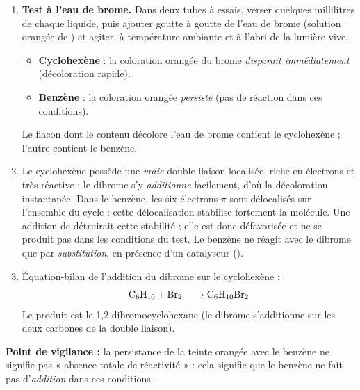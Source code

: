 \documentclass[11pt]{article}
\newcommand{\cle}[1]{{\popxbold\color{popdark}#1}}
\begin{document}
\begin{corrige}
\begin{enumerate}
\item \textbf{Test à l'eau de brome.} Dans deux tubes à essais, verser quelques millilitres de chaque liquide, puis ajouter goutte à goutte de l'eau de brome (solution orangée de ) et agiter, à température ambiante et à l'abri de la lumière vive.
\begin{itemize}
\item \textbf{Cyclohexène} : la coloration orangée du brome \emph{disparaît immédiatement} (décoloration rapide).
\item \textbf{Benzène} : la coloration orangée \emph{persiste} (pas de réaction dans ces conditions).
\end{itemize}
Le flacon dont le contenu décolore l'eau de brome contient le cyclohexène ; l'autre contient le benzène.
\item Le cyclohexène possède une \emph{vraie} double liaison  localisée, riche en électrons et très réactive : le dibrome s'y \emph{additionne} facilement, d'où la décoloration instantanée. Dans le benzène, les six électrons $\pi$ sont \cle{délocalisés} sur l'ensemble du cycle : cette délocalisation stabilise fortement la molécule. Une addition de  détruirait cette stabilité ; elle est donc défavorisée et ne se produit pas dans les conditions du test. Le benzène ne réagit avec le dibrome que par \emph{substitution}, en présence d'un catalyseur ().
\item Équation-bilan de l'addition du dibrome sur le cyclohexène :
\[ \ce{C6H10 + Br2 -> C6H10Br2} \]
Le produit est le 1,2-dibromocyclohexane (le dibrome s'additionne sur les deux carbones de la double liaison).
\end{enumerate}
\textbf{Point de vigilance :} la persistance de la teinte orangée avec le benzène ne signifie pas « absence totale de réactivité » : cela signifie que le benzène ne fait pas d'\emph{addition} dans ces conditions.
\end{corrige}
\end{document}
